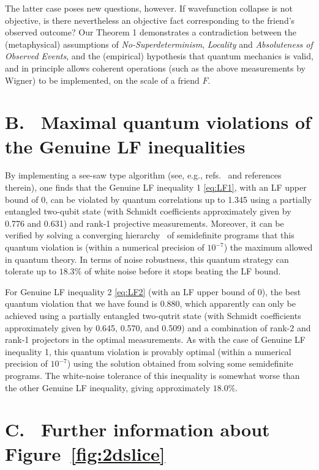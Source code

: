 \documentclass[aps,prx,twocolumn,superscriptaddress]{revtex4-1}
\theoremstyle{plain}
\newcommand{\eg}{e.g.}
\begin{document}
The latter case poses new questions, however. If wavefunction collapse is not objective, is there nevertheless an objective fact corresponding to the friend's observed outcome? Our Theorem 1 demonstrates a contradiction between the (metaphysical) assumptions of \emph{{No-Superdeterminism}}, \emph{{Locality}} and \emph{{Absoluteness of Observed Events}}, and the (empirical) hypothesis that quantum mechanics is valid, and in principle allows coherent operations (such as the above measurements by Wigner) to be implemented, on the scale of a friend $F$.

\section{B. ~Maximal quantum violations of the Genuine LF inequalities}\label{App:violations}

By implementing a see-saw type algorithm (see, \eg, refs.~\cite{See-saw1,See-saw2,Liang:2007} and references therein), one finds that the Genuine LF inequality 1 \eqref{eq:LF1}, with an LF upper bound of 0, can be violated by quantum correlations up to 1.345 using a partially entangled two-qubit state (with Schmidt coefficients approximately given by 0.776 and 0.631) and rank-1 projective measurements. Moreover, it can be verified by solving a converging hierarchy~\cite{NPA2007,NPA2008,QMP} of semidefinite programs that this quantum violation is (within a numerical precision of $10^{-7}$) the maximum allowed in quantum theory. In terms of noise robustness, this quantum strategy can tolerate up to $18.3\%$ of white noise before it stops beating the LF bound.

For Genuine LF inequality 2 \eqref{eq:LF2} (with an LF upper bound of 0), the best quantum violation that we have found is 0.880, which apparently can only be achieved using a partially entangled two-qutrit state (with Schmidt coefficients approximately given by 0.645, 0.570, and 0.509) and a combination of rank-2 and rank-1 projectors in the optimal measurements. As with the case of Genuine LF inequality 1, this quantum violation is provably optimal (within a numerical precision of $10^{-7}$) using the solution obtained from solving some semidefinite programs. The white-noise tolerance of this inequality is somewhat worse than the other Genuine LF inequality, giving approximately $18.0\%$.

\section{C. ~Further information about Figure~\ref{fig:2dslice}}\label{sec:Slice}
\end{document}
